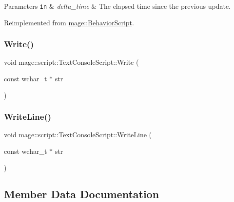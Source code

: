 \begin{DoxyParams}[1]{Parameters}
\mbox{\tt in}  & {\em delta\+\_\+time} & The elapsed time since the previous update. \\
\hline
\end{DoxyParams}


Reimplemented from \hyperlink{classmage_1_1_behavior_script_afb9cf3759edf8876416d1df85489cba6}{mage\+::\+Behavior\+Script}.

\hypertarget{classmage_1_1script_1_1_text_console_script_a210034f6226856e44d25c7796c3a2db9}{}\label{classmage_1_1script_1_1_text_console_script_a210034f6226856e44d25c7796c3a2db9} 
\subsubsection{\texorpdfstring{Write()}{Write()}}
{\footnotesize\ttfamily void mage\+::script\+::\+Text\+Console\+Script\+::\+Write (\begin{DoxyParamCaption}\item[{const wchar\+\_\+t $\ast$}]{str }\end{DoxyParamCaption})}

\hypertarget{classmage_1_1script_1_1_text_console_script_a5eac390dafa0570785e7a936df0ca0ce}{}\label{classmage_1_1script_1_1_text_console_script_a5eac390dafa0570785e7a936df0ca0ce} 
\subsubsection{\texorpdfstring{Write\+Line()}{WriteLine()}}
{\footnotesize\ttfamily void mage\+::script\+::\+Text\+Console\+Script\+::\+Write\+Line (\begin{DoxyParamCaption}\item[{const wchar\+\_\+t $\ast$}]{str }\end{DoxyParamCaption})}



\subsection{Member Data Documentation}
\hypertarget{classmage_1_1script_1_1_text_console_script_a35db160ce89d4ebf6f184d2fe850beab}{}\label{classmage_1_1script_1_1_text_console_script_a35db160ce89d4ebf6f184d2fe850beab} 
